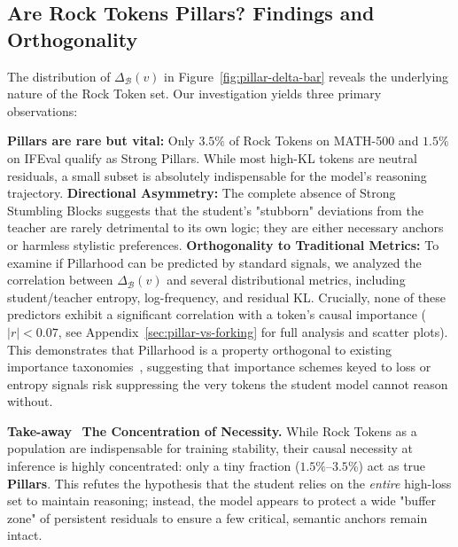 \subsection{Are Rock Tokens Pillars? Findings and Orthogonality}
\label{sec:pillar_findings}

The distribution of $\Delta_{\mathcal{B}}(v)$ in Figure~\ref{fig:pillar-delta-bar} reveals the underlying nature of the Rock Token set. Our investigation yields three primary observations:




\textbf{Pillars are rare but vital:} Only $3.5\%$ of Rock Tokens on MATH-500 and $1.5\%$ on IFEval qualify as Strong Pillars. While most high-KL tokens are neutral residuals, a small subset is absolutely indispensable for the model's reasoning trajectory.
\textbf{Directional Asymmetry:} The complete absence of Strong Stumbling Blocks suggests that the student's "stubborn" deviations from the teacher are rarely detrimental to its own logic; they are either necessary anchors or harmless stylistic preferences.
\textbf{Orthogonality to Traditional Metrics:} 
To examine if Pillarhood can be predicted by standard signals, we analyzed the correlation between $\Delta_{\mathcal{B}}(v)$ and several distributional metrics, including student/teacher entropy, log-frequency, and residual KL. 
Crucially, none of these predictors exhibit a significant correlation with a token's causal importance ($|r| < 0.07$, see Appendix~\ref{sec:pillar-vs-forking} for full analysis and scatter plots). 
This demonstrates that Pillarhood is a property orthogonal to existing importance taxonomies~\cite{tip2026}, suggesting that importance schemes keyed to loss or entropy signals risk suppressing the very tokens the student model cannot reason without.

\begin{takeaway}
\textcolor{tabblue}{\textbf{Take-away}}~
\textbf{The Concentration of Necessity.} 
While Rock Tokens as a population are indispensable for training stability, their causal necessity at inference is highly concentrated: only a tiny fraction ($1.5\%$--$3.5\%$) act as true \textbf{Pillars}. 
This refutes the hypothesis that the student relies on the \textit{entire} high-loss set to maintain reasoning; instead, the model appears to protect a wide "buffer zone" of persistent residuals to ensure a few critical, semantic anchors remain intact.
\end{takeaway}